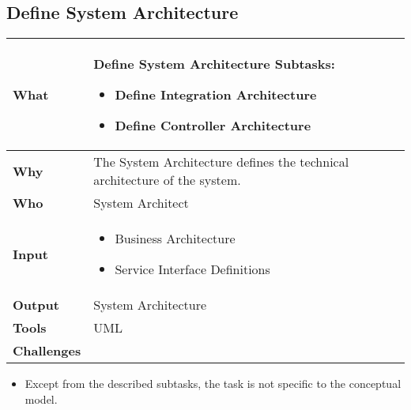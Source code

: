 \subsection{Define System Architecture }
\begin{minipage}{\textwidth}
 \label{table:ch6_Task_Define_System_Architecture}
\begin{tabular}
	{|m{3cm}|m{10cm}|} \hline \bfseries What & Define System Architecture
	Subtasks:
	\begin{itemize}
		\item Define Integration Architecture
		\item Define Controller Architecture
	\end{itemize}
	\\
	\hline \bfseries Why & The System Architecture defines the technical architecture of the system.\\
	\hline \bfseries Who & System Architect\\
	\hline \bfseries Input & 
		\begin{itemize}
			\item Business Architecture
			\item Service Interface Definitions
		\end{itemize}
	\\
	\hline \bfseries Output & System Architecture\\
	\hline \bfseries Tools & \ac{UML}\\
	\hline \bfseries Challenges & \\
	\hline 
\end{tabular}
\end{minipage}

\begin{itemize}
	\item Except from the described subtasks, the task is not specific to the conceptual model.
\end{itemize}

